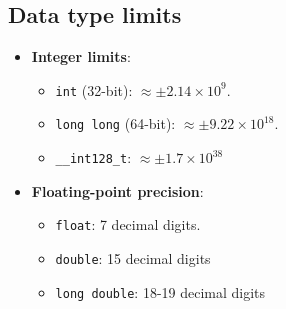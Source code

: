 \subsection{Data type limits}

\begin{itemize}
    \item \textbf{Integer limits}: 
    \begin{itemize}
        \item \texttt{int} (32-bit): $\approx \pm 2.14 \times 10^9$.
        \item \texttt{long long} (64-bit): $\approx \pm 9.22 \times 10^{18}$.
        \item \texttt{\_\_int128\_t}: $\approx \pm 1.7 \times 10^{38}$ 
    \end{itemize}
    \item \textbf{Floating-point precision}:
    \begin{itemize}
        \item \texttt{float}: 7 decimal digits.
        \item \texttt{double}: 15 decimal digits 
        \item \texttt{long double}: 18-19 decimal digits 
    \end{itemize}
\end{itemize}